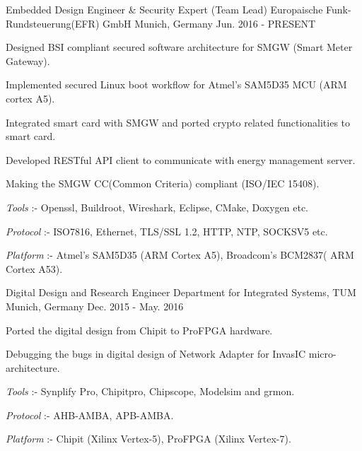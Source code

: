 

\begin{cventries}

  \cventry
    {Embedded Design Engineer \& Security Expert (Team Lead)} %
    {Europaische Funk-Rundsteuerung(EFR) GmbH} %
    {Munich, Germany} %
    {Jun. 2016 - PRESENT} %
    {
      \begin{cvitems} %
        \item {Designed BSI compliant secured software architecture for SMGW (Smart Meter Gateway).}
        \item {Implemented secured Linux boot workflow for Atmel's SAM5D35 MCU (ARM cortex A5).}
        \item {Integrated smart card with SMGW and ported crypto related functionalities to smart card.}
        \item {Developed RESTful API client to communicate with energy management server.}
        \item {Making the SMGW CC(Common Criteria) compliant (ISO/IEC 15408).}
        \item {\textit{Tools} :- Openssl, Buildroot, Wireshark, Eclipse, CMake, Doxygen etc.}
        \item {\textit{Protocol} :- ISO7816, Ethernet, TLS/SSL 1.2, HTTP, NTP, SOCKSV5 etc.}
        \item {\textit{Platform} :- Atmel's SAM5D35 (ARM Cortex A5), Broadcom's BCM2837( ARM Cortex A53).}
      \end{cvitems}
    }

  \cventry
    {Digital Design and Research Engineer} %
    {Department for Integrated Systems, TUM} %
    {Munich, Germany} %
    {Dec. 2015 - May. 2016} %
    {
      \begin{cvitems} %
        \item {Ported the digital design from Chipit to ProFPGA hardware.}
        \item {Debugging the bugs in digital design of Network Adapter for InvasIC micro-architecture.}
        \item {\textit{Tools} :-  Synplify Pro, Chipitpro, Chipscope, Modelsim and grmon.}
        \item {\textit{Protocol} :- AHB-AMBA, APB-AMBA.}
        \item {\textit{Platform} :- Chipit (Xilinx Vertex-5), ProFPGA (Xilinx Vertex-7).}
      \end{cvitems}
    }


\end{cventries}
